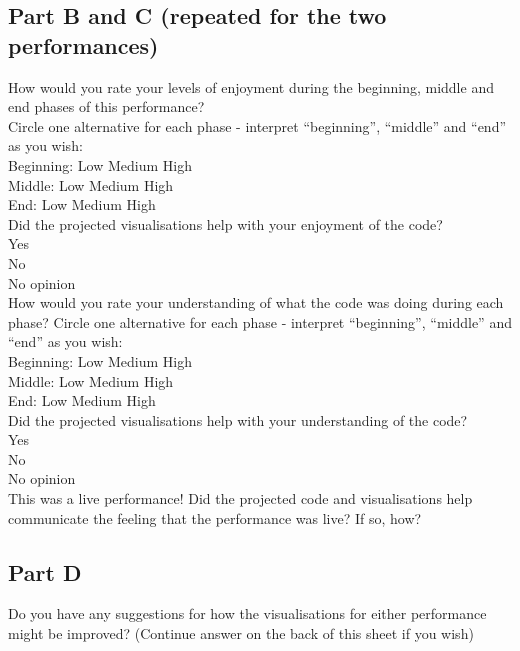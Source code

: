 \subsection*{Part B and C (repeated for the two performances)}

How would you rate your levels of enjoyment during the beginning, middle and end phases of this performance?\\
Circle one alternative for each phase - interpret “beginning”, “middle” and “end” as you wish:\\

Beginning: Low Medium High\\

Middle: Low Medium High\\

End: Low Medium High\\

Did the projected visualisations help with your enjoyment of the code?\\
Yes\\
No\\
No opinion\\

How would you rate your understanding of what the code was doing during each phase? Circle one alternative for each phase - interpret “beginning”, “middle” and “end” as you wish:\\

Beginning: Low Medium High\\

Middle: Low Medium High\\

End: Low Medium High\\

Did the projected visualisations help with your understanding of the code?\\
Yes\\
No\\
No opinion\\

This was a live performance! Did the projected code and visualisations help communicate the feeling that the performance was live? If so, how?\\

\subsection*{Part D}

Do you have any suggestions for how the visualisations for either performance might be improved? (Continue answer on the back of this sheet if you wish)\\


